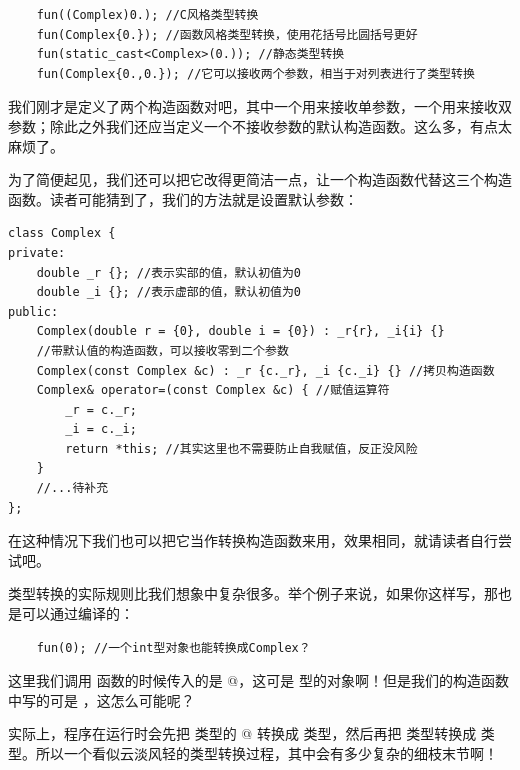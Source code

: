 \begin{lstlisting}
    fun((Complex)0.); //C风格类型转换
    fun(Complex{0.}); //函数风格类型转换，使用花括号比圆括号更好
    fun(static_cast<Complex>(0.)); //静态类型转换
    fun(Complex{0.,0.}); //它可以接收两个参数，相当于对列表进行了类型转换
\end{lstlisting}\par
我们刚才是定义了两个构造函数对吧，其中一个用来接收单参数，一个用来接收双参数；除此之外我们还应当定义一个不接收参数的默认构造函数。这么多，有点太麻烦了。\par
为了简便起见，我们还可以把它改得更简洁一点，让一个构造函数代替这三个构造函数。读者可能猜到了，我们的方法就是设置默认参数：
\begin{lstlisting}
class Complex {
private:
    double _r {}; //表示实部的值，默认初值为0
    double _i {}; //表示虚部的值，默认初值为0
public:
    Complex(double r = {0}, double i = {0}) : _r{r}, _i{i} {}
    //带默认值的构造函数，可以接收零到二个参数
    Complex(const Complex &c) : _r {c._r}, _i {c._i} {} //拷贝构造函数
    Complex& operator=(const Complex &c) { //赋值运算符
        _r = c._r;
        _i = c._i;
        return *this; //其实这里也不需要防止自我赋值，反正没风险
    }
    //...待补充
};
\end{lstlisting}
在这种情况下我们也可以把它当作转换构造函数来用，效果相同，就请读者自行尝试吧。\par
类型转换的实际规则比我们想象中复杂很多。举个例子来说，如果你这样写，那也是可以通过编译的：
\begin{lstlisting}
    fun(0); //一个int型对象也能转换成Complex？
\end{lstlisting}
这里我们调用 \lstinline@fun@ 函数的时候传入的是 @，这可是 \lstinline@int@ 型的对象啊！但是我们的构造函数中写的可是 \lstinline@double@，这怎么可能呢？\par
实际上，程序在运行时会先把 \lstinline@int@ 类型的 @ 转换成 \lstinline@double@ 类型，然后再把 \lstinline@double@ 类型转换成 \lstinline@Complex@ 类型。所以一个看似云淡风轻的类型转换过程，其中会有多少复杂的细枝末节啊！\par
